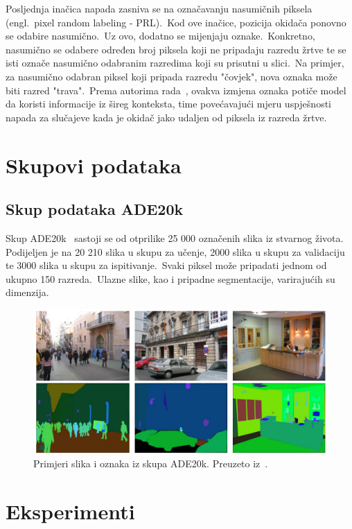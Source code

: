\documentclass[times, utf8, seminar, numeric]{fer}
\begin{document}
Posljednja inačica napada zasniva se na označavanju nasumičnih piksela (engl.\ pixel random labeling - PRL).\
Kod ove inačice, pozicija okidača ponovno se odabire nasumično.\ Uz ovo, dodatno se mijenjaju oznake.\ 
Konkretno, nasumično se odabere određen broj piksela koji ne pripadaju razredu žrtve te se isti označe nasumično odabranim razredima koji su prisutni u slici.\ 
Na primjer, za nasumično odabran piksel koji pripada razredu "čovjek", nova oznaka može biti razred "trava".\ 
Prema autorima rada~\cite{lan2023influencer}, ovakva izmjena oznaka potiče model da koristi informacije iz šireg konteksta, time povećavajući mjeru uspješnosti napada za slučajeve kada je okidač jako udaljen od piksela iz razreda žrtve.\ 

\chapter{Skupovi podataka}

\section{Skup podataka ADE20k}

Skup ADE20k~\cite{zhou2019semantic} sastoji se od otprilike 25 000 označenih slika iz stvarnog života. Podijeljen je na 20 210 slika u skupu za učenje, 2000 slika u skupu za validaciju te 3000 slika u skupu za ispitivanje.\ 
Svaki piksel može pripadati jednom od ukupno 150 razreda.\ Ulazne slike, kao i pripadne segmentacije, varirajućih su dimenzija.
  
\begin{figure}[htb]
    \centering
    \includegraphics[scale=1]{./Slike/ade20k.png}
    \caption{Primjeri slika i oznaka iz skupa ADE20k. Preuzeto iz~\cite{zhou2019semantic}.}
    \label{fig:ade20k}
\end{figure}
\chapter{Eksperimenti}
\end{document}
